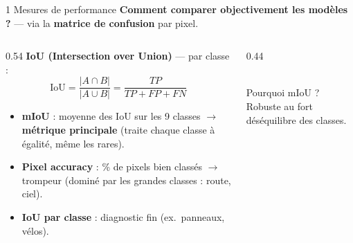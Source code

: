 \documentclass[aspectratio=169,11pt]{beamer}
\newcommand{\emphc}[1]{\textbf{\color{cvblue}#1}}
\begin{document}
\begin{frame}{1 \textbar{} Mesures de performance}
  \textbf{Comment comparer objectivement les modèles ?} — via la \emphc{matrice de confusion} par pixel.
  \vspace{0.4em}
  \begin{columns}[T]
    \begin{column}{0.54\textwidth}
      \emphc{IoU (Intersection over Union)} — par classe :
      \[
        \text{IoU} = \frac{|A \cap B|}{|A \cup B|}
                   = \frac{TP}{TP + FP + FN}
      \]
      \vspace{-0.3em}
      \begin{itemize}\footnotesize
        \item \emphc{mIoU} : moyenne des IoU sur les 9 classes
          $\rightarrow$ \textbf{métrique principale} (traite chaque classe à
          égalité, même les rares).
        \item \emphc{Pixel accuracy} : \% de pixels bien classés
          $\rightarrow$ trompeur (dominé par les grandes classes : route, ciel).
        \item \emphc{IoU par classe} : diagnostic fin (ex.\ panneaux, vélos).
      \end{itemize}
    \end{column}
    \begin{column}{0.44\textwidth}
      \centering
      \\[0.3em]
      {\footnotesize Pourquoi mIoU ? Robuste au fort déséquilibre des classes.}
    \end{column}
  \end{columns}
\end{frame}

\end{document}
